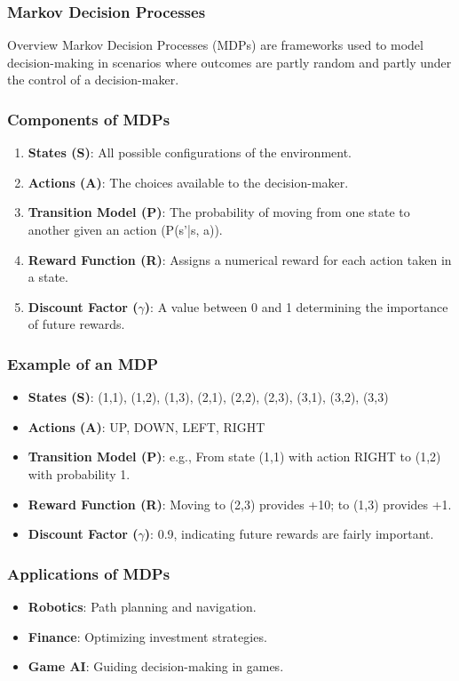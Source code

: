\documentclass[aspectratio=169]{beamer}
\begin{document}
\begin{frame}[fragile]
  \frametitle{Markov Decision Processes}
  \begin{block}{Overview}
    Markov Decision Processes (MDPs) are frameworks used to model decision-making in scenarios where outcomes are partly random and partly under the control of a decision-maker.
  \end{block}
\end{frame}

\begin{frame}[fragile]
  \frametitle{Components of MDPs}
  \begin{enumerate}
    \item \textbf{States (S)}: All possible configurations of the environment.
    \item \textbf{Actions (A)}: The choices available to the decision-maker.
    \item \textbf{Transition Model (P)}: The probability of moving from one state to another given an action (P(s'|s, a)).
    \item \textbf{Reward Function (R)}: Assigns a numerical reward for each action taken in a state.
    \item \textbf{Discount Factor ($\gamma$)}: A value between 0 and 1 determining the importance of future rewards.
  \end{enumerate}
\end{frame}

\begin{frame}[fragile]
  \frametitle{Example of an MDP}
  \begin{itemize}
    \item \textbf{States (S)}: {(1,1), (1,2), (1,3), (2,1), (2,2), (2,3), (3,1), (3,2), (3,3)}
    \item \textbf{Actions (A)}: {UP, DOWN, LEFT, RIGHT}
    \item \textbf{Transition Model (P)}: e.g., From state (1,1) with action RIGHT to (1,2) with probability 1.
    \item \textbf{Reward Function (R)}: Moving to (2,3) provides +10; to (1,3) provides +1.
    \item \textbf{Discount Factor ($\gamma$)}: 0.9, indicating future rewards are fairly important.
  \end{itemize}
\end{frame}

\begin{frame}[fragile]
  \frametitle{Applications of MDPs}
  \begin{itemize}
    \item \textbf{Robotics}: Path planning and navigation.
    \item \textbf{Finance}: Optimizing investment strategies.
    \item \textbf{Game AI}: Guiding decision-making in games.
  \end{itemize}
\end{frame}
\end{document}
